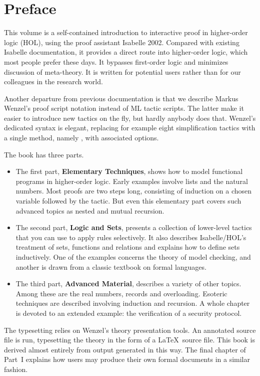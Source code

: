 \chapter*{Preface}

This volume is a self-contained introduction to interactive proof
in higher-order logic (HOL), using the proof assistant Isabelle 2002. 
Compared with existing Isabelle documentation,
it provides a direct route into higher-order logic, which most people
prefer these days. It bypasses first-order logic and minimizes
discussion of meta-theory.  It is written for potential users rather
than for our colleagues in the research world.

Another departure from previous documentation is that we describe Markus
Wenzel's proof script notation instead of ML tactic scripts.  The latter
make it easier to introduce new tactics on the fly, but hardly anybody
does that.  Wenzel's dedicated syntax is elegant, replacing for example
eight simplification tactics with a single method, namely ,
with associated options.

The book has three parts.  
\begin{itemize}
\item 
The first part, \textbf{Elementary Techniques},
shows how to model functional programs in higher-order logic.  Early
examples involve lists and the natural numbers.  Most proofs
are two steps long, consisting of induction on a chosen variable
followed by the  tactic.  But even this elementary part
covers such advanced topics as nested and mutual recursion.
\item 
The second part, \textbf{Logic and Sets}, presents a collection of
lower-level tactics that you can use to apply rules selectively.  It
also describes Isabelle/HOL's treatment of sets, functions and
relations and explains how to define sets inductively.  One of the
examples concerns the theory of model checking, and another is drawn
from a classic textbook on formal languages.
\item 
The third part, \textbf{Advanced Material}, describes a variety of
other topics.  Among these are the real numbers, records and
overloading.  Esoteric techniques are described involving induction and
recursion.  A whole chapter is devoted to an extended example: the
verification of a security protocol.
\end{itemize}

The typesetting relies on Wenzel's theory presentation tools.  An
annotated source file is run, typesetting the theory
in the form of a \LaTeX\ source file.  This book is derived almost entirely
from output generated in this way.  The final chapter of Part~I explains how
users may produce their own formal documents in a similar fashion.

